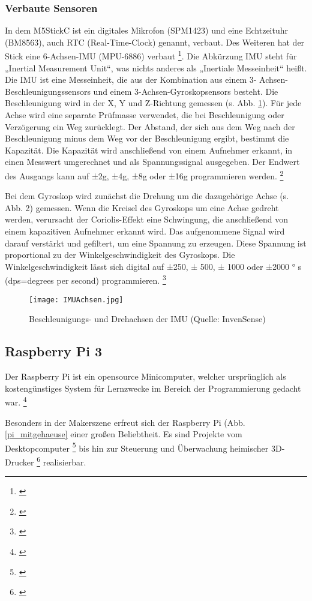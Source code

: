 \documentclass[a4paper,12pt]{article}
\begin{document}
\subsubsection{Verbaute Sensoren}
In dem M5StickC ist ein digitales Mikrofon (SPM1423) und eine Echtzeituhr (BM8563), auch RTC
(Real-Time-Clock) genannt, verbaut. Des Weiteren hat der Stick eine 6-Achsen-IMU (MPU-6886)
verbaut \footnote{\cite{M5STACK.}}. Die Abkürzung IMU steht für „Inertial Measurement Unit“, was nichts anderes als
„Inertiale Messeinheit“ heißt. Die IMU ist eine Messeinheit, die aus der Kombination aus einem 3-
Achsen- Beschleunigungssensors und einem 3-Achsen-Gyroskopsensors besteht. Die Beschleunigung
wird in der X, Y und Z-Richtung gemessen (s. Abb. \ref{IMUAchsen}). Für jede Achse wird eine separate Prüfmasse
verwendet, die bei Beschleunigung oder Verzögerung ein Weg zurücklegt. Der Abstand, der sich aus
dem Weg nach der Beschleunigung minus dem Weg vor der Beschleunigung ergibt, bestimmt die
Kapazität. Die Kapazität wird anschließend von einem Aufnehmer erkannt, in einen Messwert
umgerechnet und als Spannungssignal ausgegeben. Der Endwert des Ausgangs kann auf ±2g, ±4g,
±8g oder ±16g programmieren werden. \footnote{\cite{InvenSense.}}

Bei dem Gyroskop wird zunächst die Drehung um die dazugehörige Achse (s. Abb. 2) gemessen.
Wenn die Kreisel des Gyroskops um eine Achse gedreht werden, verursacht der Coriolis-Effekt eine
Schwingung, die anschließend von einem kapazitiven Aufnehmer erkannt wird. Das aufgenommene
Signal wird darauf verstärkt und gefiltert, um eine Spannung zu erzeugen. Diese Spannung ist
proportional zu der Winkelgeschwindigkeit des Gyroskops. Die Winkelgeschwindigkeit lässt sich
digital auf ±250, ± 500, ± 1000 oder ±2000 °
s
(dps=degrees per second) programmieren. \footnote{\cite{InvenSense.}}

\begin{figure}[H]	%
\begin{center}
\texttt{[image: IMUAchsen.jpg]}
\caption{Beschleunigungs- und Drehachsen der IMU
(Quelle: InvenSense)}
\label{IMUAchsen}
\end{center}
\end{figure}

\newpage

\subsection{Raspberry Pi 3}
Der Raspberry Pi ist ein opensource Minicomputer, welcher ursprünglich als kostengünstiges System für Lernzwecke im Bereich der Programmierung gedacht war. \footnote{\cite{RaspberryPi.20.08.2015}} \par
Besonders in der Makerszene erfreut sich der Raspberry Pi (Abb. \ref{pi_mitgehaeuse} einer großen Beliebtheit. Es sind Projekte vom Desktopcomputer \footnote{\cite{RaspberryPi.20.08.2015}} bis hin zur Steuerung und Überwachung heimischer 3D-Drucker \footnote{\cite{Hauge.20.04.2022}} realisierbar.\\[3mm]
\end{document}
